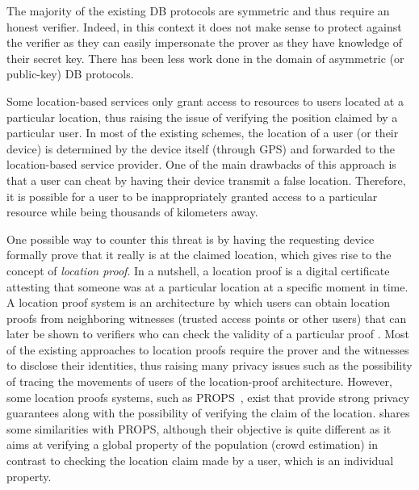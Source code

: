 The majority of the existing \ac{DB} protocols are symmetric and thus require an honest verifier.
Indeed, in this context it does not make sense to protect against the verifier as they can easily impersonate the prover as they have knowledge of their secret key.
There has been less work done in the domain of asymmetric (or public-key) \ac{DB} protocols.

Some location-based services only grant access to resources to users located at a particular location, thus raising the issue of verifying the position claimed by a particular user. 
In most of the existing schemes, the location of a user (or their device) is determined by the device itself (\eg through GPS) and forwarded to the location-based service provider. 
One of the main drawbacks of this approach is that a user can cheat by having their device transmit a false location. 
Therefore, it is possible for a user to be inappropriately granted access to a particular resource while being thousands of kilometers away.

One possible way to counter this threat is by having the requesting device formally prove that it really is at the claimed location, which gives rise to the concept of \emph{location proof}. 
In a nutshell, a location proof is a digital certificate attesting that someone was at a particular location at a specific moment in time. 
A location proof system is an architecture by which users can obtain location proofs from neighboring witnesses (\eg trusted access points or other users) that can later be shown to verifiers who can check the validity of a particular proof \cite{luo2010veriplace, zhu2011applaus}.
Most of the existing approaches to location proofs require the prover and the witnesses to disclose their identities, thus raising many privacy issues such as the possibility of tracing the movements of users of the location-proof architecture.
However, some location proofs systems, such as PROPS~\cite{PROPS}, exist that provide strong privacy guarantees along with the possibility of verifying the claim of the location.
\CROCUS shares some similarities with PROPS, although their objective is quite different as it aims at verifying a global property of the population (\ie crowd estimation) in contrast to checking the location claim made by a user, which is an individual property.

